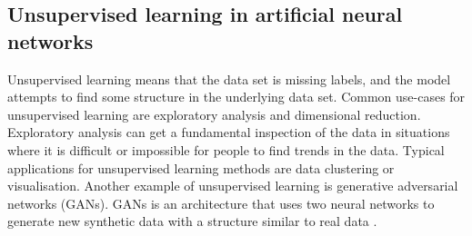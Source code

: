 \subsection{Unsupervised learning in artificial neural networks}
Unsupervised learning means that the data set is missing labels, and the model attempts to find some structure in the underlying data set. Common use-cases for unsupervised learning are exploratory analysis and dimensional reduction. Exploratory analysis can get a fundamental inspection of the data in situations where it is difficult or impossible for people to find trends in the data. Typical applications for unsupervised learning methods are data clustering or visualisation. Another example of unsupervised learning is generative adversarial networks (GANs). GANs is an architecture that uses two neural networks to generate new synthetic data with a structure similar to real data \cite{goodfellowGenerativeAdversarialNets2014}.

